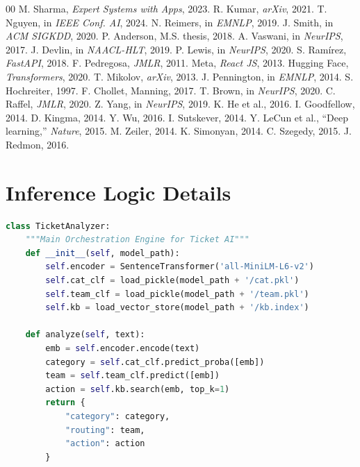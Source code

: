 \documentclass[conference]{IEEEtran}
\begin{document}
\begin{thebibliography}{00}
 M. Sharma, \textit{Expert Systems with Apps}, 2023.
 R. Kumar, \textit{arXiv}, 2021.
 T. Nguyen, in \textit{IEEE Conf. AI}, 2024.
 N. Reimers, in \textit{EMNLP}, 2019.
 J. Smith, in \textit{ACM SIGKDD}, 2020.
 P. Anderson, M.S. thesis, 2018.
 A. Vaswani, in \textit{NeurIPS}, 2017.
 J. Devlin, in \textit{NAACL-HLT}, 2019.
 P. Lewis, in \textit{NeurIPS}, 2020.
 S. Ramírez, \textit{FastAPI}, 2018.
 F. Pedregosa, \textit{JMLR}, 2011.
 Meta, \textit{React JS}, 2013.
 Hugging Face, \textit{Transformers}, 2020.
 T. Mikolov, \textit{arXiv}, 2013.
 J. Pennington, in \textit{EMNLP}, 2014.
 S. Hochreiter, 1997.
 F. Chollet, Manning, 2017.
 T. Brown, in \textit{NeurIPS}, 2020.
 C. Raffel, \textit{JMLR}, 2020.
 Z. Yang, in \textit{NeurIPS}, 2019.
 K. He et al., 2016.
 I. Goodfellow, 2014.
 D. Kingma, 2014.
 Y. Wu, 2016.
 I. Sutskever, 2014.
 Y. LeCun et al., ``Deep learning,'' \textit{Nature}, 2015.
 M. Zeiler, 2014.
 K. Simonyan, 2014.
 C. Szegedy, 2015.
 J. Redmon, 2016.
\end{thebibliography}

\appendices
\section{Inference Logic Details}
\begin{lstlisting}[language=Python]
class TicketAnalyzer:
    """Main Orchestration Engine for Ticket AI"""
    def __init__(self, model_path):
        self.encoder = SentenceTransformer('all-MiniLM-L6-v2')
        self.cat_clf = load_pickle(model_path + '/cat.pkl')
        self.team_clf = load_pickle(model_path + '/team.pkl')
        self.kb = load_vector_store(model_path + '/kb.index')

    def analyze(self, text):
        emb = self.encoder.encode(text)
        category = self.cat_clf.predict_proba([emb])
        team = self.team_clf.predict([emb])
        action = self.kb.search(emb, top_k=1)
        return {
            "category": category,
            "routing": team,
            "action": action
        }
\end{lstlisting}
\end{document}
